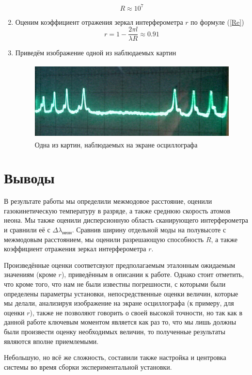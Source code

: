 \documentclass[12pt]{article}
\begin{document}
\begin{enumerate}
		\[
			R \approx 10^7
		\]
	\item
		Оценим коэффициент отражения зеркал интерферометра $r$ по формуле (\ref{Re})
		\[
			r = 1 - \frac{2 \pi l}{\lambda R} \approx 0.91
		\]
	\item
		Приведём изображение одной из наблюдаемых картин
		\begin{figure}[h!]
			\centering
			\includegraphics[width = 11cm, height = 4cm]{image4.png}
			\caption{Одна из картин, наблюдаемых на экране осциллографа}
		\end{figure}
\end{enumerate}
\section*{Выводы}
\par
	В результате работы мы определили межмодовое расстояние, оценили газокинетическую температуру в разряде, а также среднюю скорость атомов неона. Мы также оценили дисперсионную область сканирующего интерферометра и сравнили её с $\Delta \lambda_\text{неон}$. Сравнив ширину отдельной моды на полувысоте с межмодовым расстоянием, мы оценили разрешающую способность $R$, а также коэффициент отражения зеркал интерферометра $r$.
\par
	Произведённые оценки соответсвуют предполагаемым эталонным ожидаемым значениям (кроме $r$), приведённым в описании к работе. Однако стоит отметить, что кроме того, что нам не были известны погрешности, с которыми были определены параметры установки, непосредственные оценки величин, которые мы делали, анализируя изображение на экране осциллографа (к примеру, для оценки $r$), также не позволяют говорить о своей высокой точности, но так как в данной работе ключевым моментом является как раз то, что мы лишь должны были произвести оценку необходимых величин, то полученные результаты являются вполне приемлемыми.
\par
	Небольшую, но всё же сложность, составили также настройка и центровка системы во время сборки экспериментальной установки.
\end{document}
